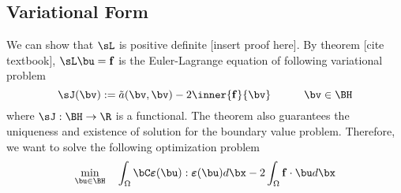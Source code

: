 \documentclass[11pt]{article}
\newcommand{\bepsilon}{\boldsymbol{\varepsilon}}
\renewcommand{\bf}{\mathbf{f}}
\newcommand{\ta}{\tilde{a}}
\begin{document}
\subsection*{Variational Form}
We can show that $\sL$ is positive definite [insert proof here]. By theorem [cite textbook], $\sL \bu = \bf$ is the Euler-Lagrange equation of following variational problem
\[
    \sJ(\bv) := \ta(\bv,\bv) - 2\inner{\bf}{\bv}
    \quad\quad\quad
    \bv\in\BH
\]
where $\sJ: \BH\to \R$ is a functional. The theorem also guarantees the uniqueness and existence of solution for the boundary value problem. Therefore, we want to solve the following optimization problem
\[
    \min_{\bu\in \BH} \quad
        \int_{\Omega} \bC \bepsilon(\bu) : \bepsilon(\bu) d\bx 
      - 2\int_{\Omega} \bf \cdot\bu d\bx
\]
 


\newpage
\printbibliography
\end{document}
